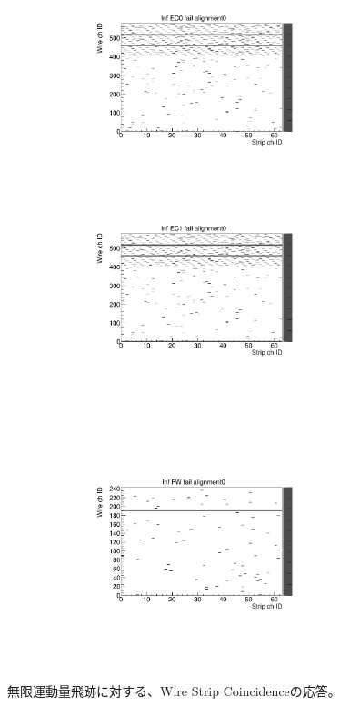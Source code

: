 \begin{figure}
    \begin{minipage}[b]{.5\linewidth}
        \centering
        \includegraphics[height=6cm]{fig/Test/A_InfEC0_WS.pdf}
    \end{minipage}
    \begin{minipage}[b]{.5\linewidth}
        \centering
        \includegraphics[height=6cm]{fig/Test/A_InfEC1_WS.pdf}
    \end{minipage}\\
    \begin{minipage}[b]{\linewidth}
        \centering
        \includegraphics[height=6cm]{fig/Test/A_InfFW_WS.pdf}
    \end{minipage}
    \caption[異なる画像形式の比較]{無限運動量飛跡に対する、Wire Strip Coincidenceの応答。}
    \label{Inf_A_WS}
\end{figure}

